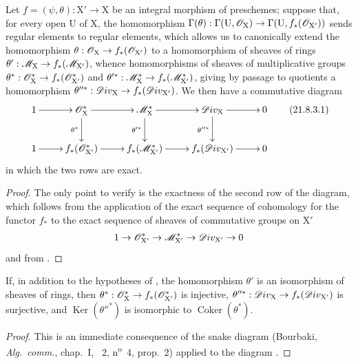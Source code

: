 \begin{proposition}[21.8.3]
\label{IV.21.8.3}
Let $f=(\psi,\theta):\mathrm{X}'\to\mathrm{X}$ be an integral morphism of preschemes;
suppose that, for every open $\mathrm{U}$ of $\mathrm{X}$, the homomorphism $\Gamma(\theta):\Gamma(\mathrm{U},\mathscr{O}_\mathrm{X})\to\Gamma(\mathrm{U},f_*(\mathscr{O}_{\mathrm{X}'}))$ sends regular elements to regular elements, which allows us to canonically extend the homomorphism $\theta:\mathscr{O}_\mathrm{X}\to f_*(\mathscr{O}_{\mathrm{X}'})$ to a homomorphism of sheaves of rings $\theta':\mathscr{M}_\mathrm{X}\to f_*(\mathscr{M}_{\mathrm{X}'})$, whence homomorphisms of sheaves of multiplicative groups $\theta^*:\mathscr{O}^*_\mathrm{X}\to f_*(\mathscr{O}^*_{\mathrm{X}'})$ and $\theta'^*:\mathscr{M}^*_\mathrm{X}\to f_*(\mathscr{M}^*_{\mathrm{X}'})$, giving by passage to quotients a homomorphism $\theta''^*:\mathscr{D}iv_\mathrm{X}\to f_*(\mathscr{D}iv_{\mathrm{X}'})$.
We then have a commutative diagram
\[
\label{IV.21.8.3.1}
  \xymatrix{
    1 \ar[r] & \sh{O}^*_\mathrm{X} \ar[r] \ar[d]_{\theta^*} & \sh{M}^*_\mathrm{X} \ar[r] \ar[d]_{\theta'^*} & \sh{D}iv_\mathrm{X} \ar[r] \ar[d]_{\theta''^*} & 0\\
    1 \ar[r] & f_*(\sh{O}^*_{\mathrm{X}'}) \ar[r] & f_*(\sh{M}^*_{\mathrm{X}'}) \ar[r] & f_*(\sh{D}iv_{\mathrm{X}'}) \ar[r] & 0
  }
  \tag{21.8.3.1}
\]
in which the two rows are exact.
\end{proposition}

\begin{proof}
The only point to verify is the exactness of the second row of the diagram, which follows from the application of the exact sequence of cohomology for the functor $f_*$ to the exact sequence of sheaves of commutative groups on $\mathrm{X}'$
\[
  1\to\mathscr{O}^*_{\mathrm{X}'}\to\mathscr{M}^*_{\mathrm{X}'}\to\mathscr{D}iv_{\mathrm{X}'}\to 0
\]
and from .
\end{proof}

\begin{corollary}[21.8.4]
\label{IV.21.8.4}
If, in addition to the hypotheses of , the homomorphism $\theta'$ is an isomorphism of sheaves of rings, then $\theta^*:\mathscr{O}^*_\mathrm{X}\to f_*(\mathscr{O}^*_{\mathrm{X}'})$ is injective, $\theta''^*:\mathscr{D}iv_\mathrm{X}\to f_*(\mathscr{D}iv_{\mathrm{X}'})$ is surjective, and $\operatorname{Ker}(\theta''^*)$ is isomorphic to $\operatorname{Coker}(\theta^*)$.
\end{corollary}

\begin{proof}
This is an immediate consequence of the snake diagram (Bourbaki, \emph{Alg.\ comm.}, chap.~I, \textsection~2, n\textsuperscript{o}~4, prop.~2) applied to the diagram .
\end{proof}

